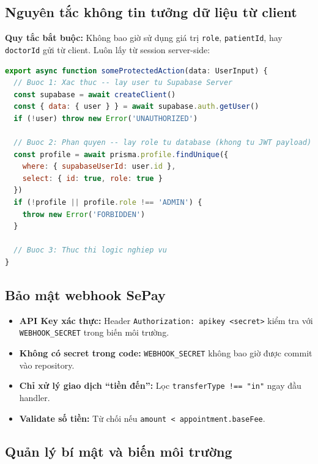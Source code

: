 \documentclass[14pt,a4paper]{report}
\begin{document}
\subsection{Nguyên tắc không tin tưởng dữ liệu từ client}

\textbf{Quy tắc bắt buộc:} Không bao giờ sử dụng giá trị \texttt{role},
\texttt{patientId}, hay \texttt{doctorId} gửi từ client. Luôn lấy
từ session server-side:

\begin{lstlisting}[language=JavaScript, caption={Mẫu chuẩn -- Lấy role từ database, không từ client}]
export async function someProtectedAction(data: UserInput) {
  // Buoc 1: Xac thuc -- lay user tu Supabase Server
  const supabase = await createClient()
  const { data: { user } } = await supabase.auth.getUser()
  if (!user) throw new Error('UNAUTHORIZED')

  // Buoc 2: Phan quyen -- lay role tu database (khong tu JWT payload)
  const profile = await prisma.profile.findUnique({
    where: { supabaseUserId: user.id },
    select: { id: true, role: true }
  })
  if (!profile || profile.role !== 'ADMIN') {
    throw new Error('FORBIDDEN')
  }

  // Buoc 3: Thuc thi logic nghiep vu
}
\end{lstlisting}

\subsection{Bảo mật webhook SePay}

\begin{itemize}
    \item \textbf{API Key xác thực:} Header
          \texttt{Authorization: apikey <secret>} kiểm tra với
          \texttt{WEBHOOK\_SECRET} trong biến môi trường.
    \item \textbf{Không có secret trong code:} \texttt{WEBHOOK\_SECRET}
          không bao giờ được commit vào repository.
    \item \textbf{Chỉ xử lý giao dịch ``tiền đến'':} Lọc
          \texttt{transferType !== "in"} ngay đầu handler.
    \item \textbf{Validate số tiền:} Từ chối nếu
          \texttt{amount < appointment.baseFee}.
\end{itemize}

\subsection{Quản lý bí mật và biến môi trường}
\end{document}
